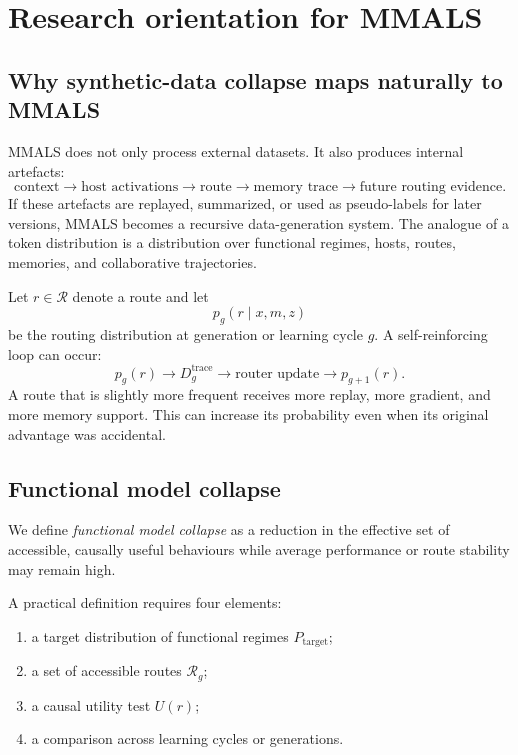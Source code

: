\section{Research orientation for MMALS}

\subsection{Why synthetic-data collapse maps naturally to MMALS}

MMALS does not only process external datasets. It also produces internal artefacts:
\[
\text{context}
\rightarrow
\text{host activations}
\rightarrow
\text{route}
\rightarrow
\text{memory trace}
\rightarrow
\text{future routing evidence}.
\]
If these artefacts are replayed, summarized, or used as pseudo-labels for later versions, MMALS becomes a recursive data-generation system. The analogue of a token distribution is a distribution over functional regimes, hosts, routes, memories, and collaborative trajectories.

Let $r\in\mathcal R$ denote a route and let
\[
p_g(r\mid x,m,z)
\]
be the routing distribution at generation or learning cycle $g$. A self-reinforcing loop can occur:
\[
p_g(r)
\rightarrow
D_g^{\mathrm{trace}}
\rightarrow
\text{router update}
\rightarrow
p_{g+1}(r).
\]
A route that is slightly more frequent receives more replay, more gradient, and more memory support. This can increase its probability even when its original advantage was accidental.

\subsection{Functional model collapse}

We define \emph{functional model collapse} as a reduction in the effective set of accessible, causally useful behaviours while average performance or route stability may remain high.

A practical definition requires four elements:

\begin{enumerate}[leftmargin=*]
  \item a target distribution of functional regimes $P_{\mathrm{target}}$;
  \item a set of accessible routes $\mathcal R_g$;
  \item a causal utility test $U(r)$;
  \item a comparison across learning cycles or generations.
\end{enumerate}

